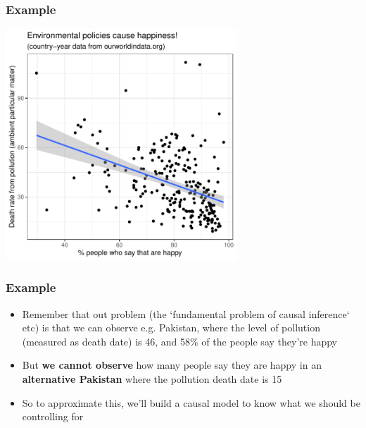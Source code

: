 \documentclass[aspectratio=43]{beamer}
\begin{document}
\begin{frame}
\frametitle{Example}
\centering

\includegraphics[width = 0.65\textwidth]{../img/happiness_pollution}

\end{frame}

\begin{frame}
\frametitle{Example}
\centering

\begin{itemize}
  \item Remember that out problem (the `fundamental problem of causal inference` etc) is that we can observe e.g. Pakistan, where the level of pollution (measured as death date) is 46, and 58\% of the people say they're happy
  \item But \textbf{we cannot observe} how many people say they are happy in an \textbf{alternative Pakistan} where the pollution death date is 15
  \item So to approximate this, we'll build a causal model to know what we should be controlling for
\end{itemize}

\end{frame}
\end{document}

